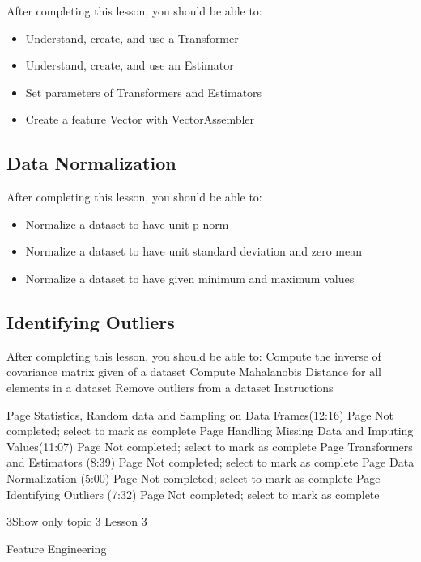After completing this lesson, you should be able to:
\begin{itemize}
\item Understand, create, and use a Transformer
\item Understand, create, and use an Estimator
\item Set parameters of Transformers and Estimators
\item Create a feature Vector with VectorAssembler
\end{itemize}
\subsection{Data Normalization}

After completing this lesson, you should be able to:
\begin{itemize}
\item Normalize a dataset to have unit p-norm
\item Normalize a dataset to have unit standard deviation and zero mean
\item Normalize a dataset to have given minimum and maximum values
\end{itemize}
\subsection{Identifying Outliers}

After completing this lesson, you should be able to:
Compute the inverse of covariance matrix given of a dataset
Compute Mahalanobis Distance for all elements in a dataset
Remove outliers from a dataset
Instructions


Page Statistics, Random data and Sampling on Data Frames(12:16) Page Not completed; select to mark as complete
Page Handling Missing Data and Imputing Values(11:07) Page Not completed; select to mark as complete
Page Transformers and Estimators (8:39) Page Not completed; select to mark as complete
Page Data Normalization (5:00) Page Not completed; select to mark as complete
Page Identifying Outliers (7:32) Page Not completed; select to mark as complete

3Show only topic 3
Lesson 3

Feature Engineering
 


